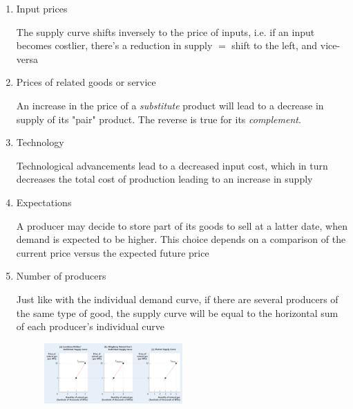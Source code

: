 \documentclass[english,course]{Notes}
\newcommand{\ita}[1]{\textit{#1}}
\begin{document}
\begin{enumerate}
	\item Input prices
	
	
	\par{The supply curve shifts inversely to the price of inputs, i.e. if an input becomes costlier, there's a reduction in supply $=$ shift to the left, and vice-versa}
	
	\item Prices of related goods or service
	
	\par{An increase in the price of a \ita{substitute} product will lead to a decrease in supply of its "pair" product. The reverse is true for its \ita{complement}.}
	

	\item Technology
	
	\par{Technological advancements lead to a decreased input cost, which in turn decreases the total cost of production leading to an increase in supply}
	
	\item Expectations
	
	\par{A producer may decide to store part of its goods to sell at a latter date, when demand is expected to be higher. This choice depends on a comparison of the current price versus the expected future price}
	
	\item Number of producers
	
	\par{Just like with the individual demand curve, if there are several producers of the same type of good, the supply curve will be equal to the horizontal sum of each producer's individual curve}
	
	\begin{figure}[ht]
\centering
\includegraphics[width=0.5\textwidth]{supplyIndividual}
\end{figure}

\end{enumerate}
\end{document}

